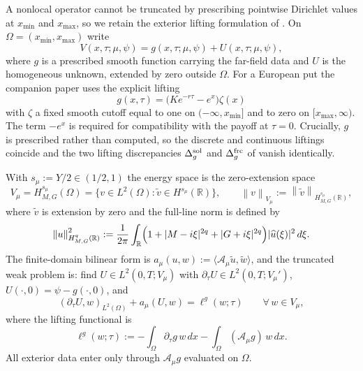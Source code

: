 \documentclass[11pt]{amsart}
\theoremstyle{remark}
\newcommand{\R}{\mathbb{R}}
\newcommand{\Vmu}{V_{\mu}}
\newcommand{\norm}[1]{\left\lVert #1\right\rVert}
\newcommand{\rf}{r}
\newcommand{\Hs}{H^{s_\mu}_{M,G}}
\newcommand{\Aop}{\mathcal A_\mu}
\begin{document}
A nonlocal operator cannot be truncated by prescribing pointwise Dirichlet
values at $x_{\min}$ and $x_{\max}$, so we retain the exterior lifting
formulation of \cite{DamircheliCGMY2026}.  On $\Omega=(x_{\min},x_{\max})$
write
\begin{equation}
  V(x,\tau;\mu,\psi)=g(x,\tau;\mu,\psi)+U(x,\tau;\mu,\psi),
  \label{eq:lifting-split}
\end{equation}
where $g$ is a prescribed smooth function carrying the far-field data and $U$
is the homogeneous unknown, extended by zero outside $\Omega$.  For a
European put the companion paper uses the explicit lifting
\begin{equation}
  g(x,\tau)=\bigl(Ke^{-\rf\tau}-e^{x}\bigr)\zeta(x)
  \label{eq:lifting-put}
\end{equation}
with $\zeta$ a fixed smooth cutoff equal to one on $(-\infty,x_{\min}]$ and to
zero on $[x_{\max},\infty)$.  The term $-e^x$ is required for compatibility
with the payoff at $\tau=0$.  Crucially, $g$ is prescribed rather than
computed, so the discrete and continuous liftings coincide and the two lifting
discrepancies $\Delta_g^{\rm sol}$ and $\Delta_g^{\rm frc}$ of
\cite{DamircheliCGMY2026} vanish identically.

With $s_\mu:=Y/2\in(1/2,1)$ the energy space is the zero-extension space
\begin{equation}
  \Vmu=\Hs(\Omega)
  =\bigl\{v\in L^2(\Omega):\widetilde v\in H^{s_\mu}(\R)\bigr\},
  \qquad
  \norm{v}_{\Vmu}:=\norm{\widetilde v}_{H^{s_\mu}_{M,G}(\R)},
  \label{eq:energy-space}
\end{equation}
where $\widetilde v$ is extension by zero and the full-line norm is defined by
\begin{equation}
  \norm{u}_{H^{q}_{M,G}(\R)}^2
  :=\frac1{2\pi}\int_\R
  \Bigl(1+|M-i\xi|^{2q}+|G+i\xi|^{2q}\Bigr)|\widehat u(\xi)|^2\,d\xi .
  \label{eq:HMG-norm}
\end{equation}
The finite-domain bilinear form is
$a_\mu(u,w):=\langle\Aop\widetilde u,\widetilde w\rangle$, and the truncated
weak problem is: find $U\in L^2(0,T;\Vmu)$ with
$\partial_\tau U\in L^2(0,T;\Vmu')$, $U(\cdot,0)=\psi-g(\cdot,0)$, and
\begin{equation}
  (\partial_\tau U,w)_{L^2(\Omega)}+a_\mu(U,w)=\ell^g(w;\tau)
  \qquad\forall\,w\in\Vmu,
  \label{eq:weak-problem}
\end{equation}
where the lifting functional is
\begin{equation}
  \ell^{g}(w;\tau)
  :=-\int_\Omega\partial_\tau g\,w\,dx-\int_\Omega(\Aop g)\,w\,dx .
  \label{eq:lifting-functional}
\end{equation}
All exterior data enter only through $\Aop g$ evaluated on $\Omega$.
\end{document}
